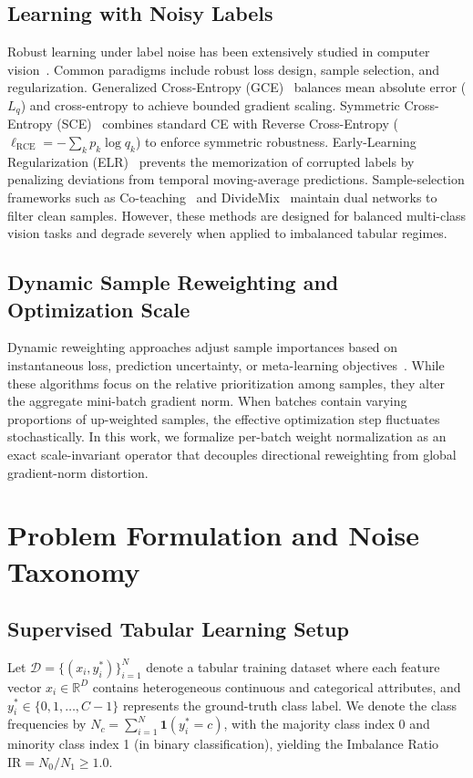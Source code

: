 \documentclass[preprint,12pt]{elsarticle}
\newcommand{\indicator}{\mathbf{1}}
\begin{document}
\subsection{Learning with Noisy Labels}
Robust learning under label noise has been extensively studied in computer vision~\cite{frenay2014classification}. Common paradigms include robust loss design, sample selection, and regularization. Generalized Cross-Entropy (GCE)~\cite{zhang2018generalized} balances mean absolute error ($L_q$) and cross-entropy to achieve bounded gradient scaling. Symmetric Cross-Entropy (SCE)~\cite{wang2019symmetric} combines standard CE with Reverse Cross-Entropy ($\ell_{\mathrm{RCE}} = -\sum_k p_k \log q_k$) to enforce symmetric robustness. Early-Learning Regularization (ELR)~\cite{liu2020early} prevents the memorization of corrupted labels by penalizing deviations from temporal moving-average predictions. Sample-selection frameworks such as Co-teaching~\cite{han2018coteaching} and DivideMix~\cite{li2020dividemix} maintain dual networks to filter clean samples. However, these methods are designed for balanced multi-class vision tasks and degrade severely when applied to imbalanced tabular regimes.

\subsection{Dynamic Sample Reweighting and Optimization Scale}
Dynamic reweighting approaches adjust sample importances based on instantaneous loss, prediction uncertainty, or meta-learning objectives~\cite{ren2018learning,kumar2010self}. While these algorithms focus on the relative prioritization among samples, they alter the aggregate mini-batch gradient norm. When batches contain varying proportions of up-weighted samples, the effective optimization step fluctuates stochastically. In this work, we formalize per-batch weight normalization as an exact scale-invariant operator that decouples directional reweighting from global gradient-norm distortion.


\section{Problem Formulation and Noise Taxonomy}
\label{sec:problem}

\subsection{Supervised Tabular Learning Setup}
Let $\mathcal{D} = \{(x_i, y_i^*)\}_{i=1}^N$ denote a tabular training dataset where each feature vector $x_i \in \mathbb{R}^D$ contains heterogeneous continuous and categorical attributes, and $y_i^* \in \{0, 1, \dots, C-1\}$ represents the ground-truth class label. We denote the class frequencies by $N_c = \sum_{i=1}^N \indicator(y_i^* = c)$, with the majority class index 0 and minority class index 1 (in binary classification), yielding the Imbalance Ratio $\mathrm{IR} = N_0 / N_1 \ge 1.0$.
\end{document}
